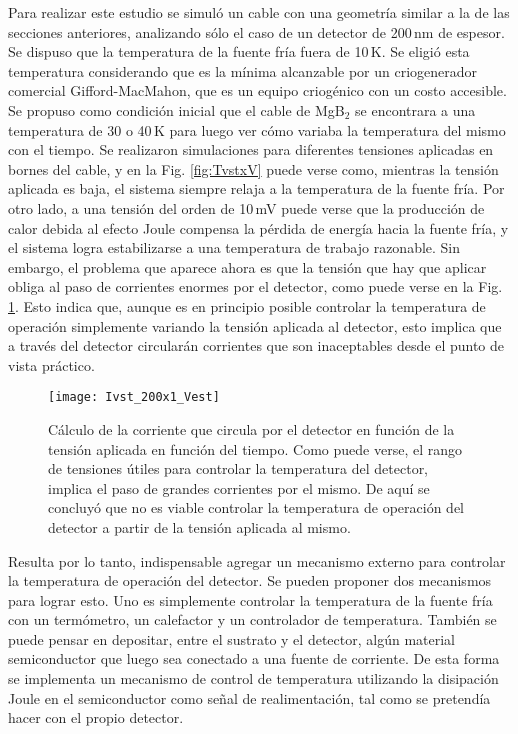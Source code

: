Para realizar este estudio se simuló un cable con una geometría similar a la de las secciones anteriores, analizando sólo el caso de un detector de 200\,nm de espesor. Se dispuso que la temperatura de la fuente fría fuera de 10\,K. Se eligió esta temperatura considerando que es la mínima alcanzable por un criogenerador comercial Gifford-MacMahon, que es un equipo criogénico con un costo accesible. Se propuso como condición inicial que el cable de MgB$_2$ se encontrara a una temperatura de 30 o 40\,K para luego ver cómo variaba la temperatura del mismo con el tiempo. Se realizaron simulaciones para diferentes tensiones aplicadas en bornes del cable, y en la Fig. \ref{fig:TvstxV} puede verse como, mientras la tensión aplicada es baja, el sistema siempre relaja a la temperatura de la fuente fría. Por otro lado, a una tensión del orden de 10\,mV puede verse que la producción de calor debida al efecto Joule compensa la pérdida de energía hacia la fuente fría, y el sistema logra estabilizarse a una temperatura de trabajo razonable.
Sin embargo, el problema que aparece ahora es que la tensión que hay que aplicar obliga al paso de corrientes enormes por el detector, como puede verse en la Fig. \ref{fig:IvstxV}. Esto indica que, aunque es en principio posible controlar la temperatura de operación simplemente variando la tensión aplicada al detector, esto implica que a través del detector circularán corrientes que son inaceptables desde el punto de vista práctico.
  \begin{figure}[tbh!]
	\begin{center}
	  \texttt{[image: Ivst\_200x1\_Vest]}
	\end{center}
	\caption[Cálculo de la corriente que circula por el detector en función de la tensión aplicada en función del tiempo.]{Cálculo de la corriente que circula por el detector en función de la tensión aplicada en función del tiempo. Como puede verse, el rango de tensiones útiles para controlar la temperatura del detector, implica el paso de grandes corrientes por el mismo. De aquí se concluyó que no es viable controlar la temperatura de operación del detector a partir de la tensión aplicada al mismo.}
	\label{fig:IvstxV}
  \end{figure}

Resulta por lo tanto, indispensable agregar un mecanismo externo para controlar la temperatura de operación del detector. Se pueden proponer dos mecanismos para lograr esto. Uno es simplemente controlar la temperatura de la fuente fría con un termómetro, un calefactor y un controlador de temperatura. También se puede pensar en depositar, entre el sustrato y el detector, algún material semiconductor que luego sea conectado a una fuente de corriente. De esta forma se implementa un mecanismo de control de temperatura utilizando la disipación Joule en el semiconductor como señal de realimentación, tal como se pretendía hacer con el propio detector.

